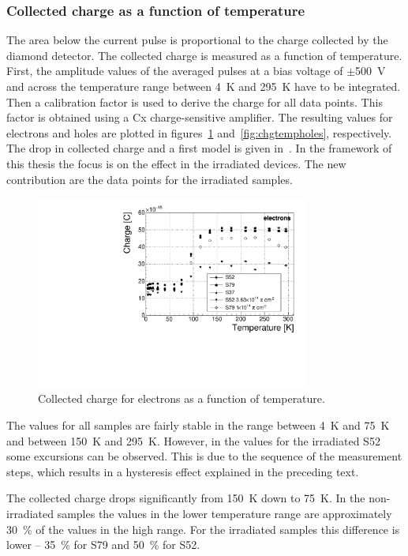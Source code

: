 \subsubsection{Collected charge as a function of temperature}
\label{subsec:qvst}
The area below the current pulse is proportional to the charge collected by the diamond detector. The collected charge is measured as a function of temperature. First, the amplitude values of the averaged pulses at a bias voltage of $\pm$500~V and across the temperature range between 4~K and 295~K have to be integrated. Then a calibration factor is used to derive the charge for all data points. This factor is obtained using a Cx charge-sensitive amplifier. The resulting values for electrons and holes are plotted in figures~\ref{fig:chgtempelecs} and~\ref{fig:chgtempholes}, respectively.
The drop in collected charge and a first model is given in~\cite{Jansen:1956431}. In the framework of this thesis the focus is on the effect in the irradiated devices. The new contribution are the data points for the irradiated samples. 
\begin{figure}[!t]
\centering
\includegraphics[width=0.80\textwidth]{03_measurement_results/scripts/plots/charge500V} 
\caption{Collected charge for electrons as a function of temperature.}
\label{fig:chgtempelecs}
\end{figure}
The values for all samples are fairly stable in the range between 4~K and 75~K and between 150~K and 295~K. However, in the values for the irradiated S52 some excursions can be observed. This is due to the sequence of the measurement steps, which results in a hysteresis effect explained in the preceding text.

The collected charge drops significantly from 150~K down to 75~K. In the non-irradiated samples the values in the lower temperature range are approximately 30~\% of the values in the high range. For the irradiated samples this difference is lower -- 35~\% for S79 and 50~\% for S52. 

